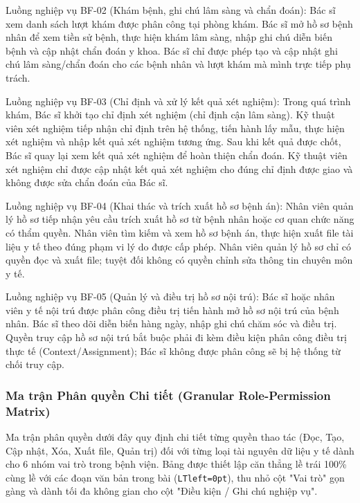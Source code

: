 Luồng nghiệp vụ BF-02 (Khám bệnh, ghi chú lâm sàng và chẩn đoán): Bác sĩ xem danh sách lượt khám được phân công tại phòng khám. Bác sĩ mở hồ sơ bệnh nhân để xem tiền sử bệnh, thực hiện khám lâm sàng, nhập ghi chú diễn biến bệnh và cập nhật chẩn đoán y khoa. Bác sĩ chỉ được phép tạo và cập nhật ghi chú lâm sàng/chẩn đoán cho các bệnh nhân và lượt khám mà mình trực tiếp phụ trách.

Luồng nghiệp vụ BF-03 (Chỉ định và xử lý kết quả xét nghiệm): Trong quá trình khám, Bác sĩ khởi tạo chỉ định xét nghiệm (chỉ định cận lâm sàng). Kỹ thuật viên xét nghiệm tiếp nhận chỉ định trên hệ thống, tiến hành lấy mẫu, thực hiện xét nghiệm và nhập kết quả xét nghiệm tương ứng. Sau khi kết quả được chốt, Bác sĩ quay lại xem kết quả xét nghiệm để hoàn thiện chẩn đoán. Kỹ thuật viên xét nghiệm chỉ được cập nhật kết quả xét nghiệm cho đúng chỉ định được giao và không được sửa chẩn đoán của Bác sĩ.

Luồng nghiệp vụ BF-04 (Khai thác và trích xuất hồ sơ bệnh án): Nhân viên quản lý hồ sơ tiếp nhận yêu cầu trích xuất hồ sơ từ bệnh nhân hoặc cơ quan chức năng có thẩm quyền. Nhân viên tìm kiếm và xem hồ sơ bệnh án, thực hiện xuất file tài liệu y tế theo đúng phạm vi lý do được cấp phép. Nhân viên quản lý hồ sơ chỉ có quyền đọc và xuất file; tuyệt đối không có quyền chỉnh sửa thông tin chuyên môn y tế.

Luồng nghiệp vụ BF-05 (Quản lý và điều trị hồ sơ nội trú): Bác sĩ hoặc nhân viên y tế nội trú được phân công điều trị tiến hành mở hồ sơ nội trú của bệnh nhân. Bác sĩ theo dõi diễn biến hàng ngày, nhập ghi chú chăm sóc và điều trị. Quyền truy cập hồ sơ nội trú bắt buộc phải đi kèm điều kiện phân công điều trị thực tế (Context/Assignment); Bác sĩ không được phân công sẽ bị hệ thống từ chối truy cập.

\subsubsection{Ma trận Phân quyền Chi tiết (Granular Role-Permission Matrix)}

Ma trận phân quyền dưới đây quy định chi tiết từng quyền thao tác (Đọc, Tạo, Cập nhật, Xóa, Xuất file, Quản trị) đối với từng loại tài nguyên dữ liệu y tế dành cho 6 nhóm vai trò trong bệnh viện. Bảng được thiết lập căn thẳng lề trái 100\% cùng lề với các đoạn văn bản trong bài (\texttt{LTleft=0pt}), thu nhỏ cột "Vai trò" gọn gàng và dành tối đa không gian cho cột "Điều kiện / Ghi chú nghiệp vụ".

